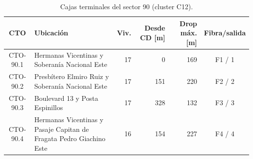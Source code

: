 \begin{table}[H]\centering\footnotesize
\caption{Cajas terminales del sector 90 (cluster C12).}\label{tab:sector90}
\begin{tabular}{|c|p{4.0cm}|r|r|r|c|}\hline \textbf{CTO} & \textbf{Ubicación} & \textbf{Viv.} & \textbf{Desde CD [m]} & \textbf{Drop máx. [m]} & \textbf{Fibra/salida} \\ \hline
CTO-90.1 & Hermanas Vicentinas y Soberanía Nacional Este & 17 & 0 & 169 & F1 / 1 \\ \hline
CTO-90.2 & Presbítero Elmiro Ruiz y Soberanía Nacional Este & 17 & 151 & 220 & F2 / 2 \\ \hline
CTO-90.3 & Boulevard 13 y Posta Espinillos & 17 & 328 & 132 & F3 / 3 \\ \hline
CTO-90.4 & Hermanas Vicentinas y Pasaje Capitan de Fragata Pedro Giachino Este & 16 & 154 & 227 & F4 / 4 \\ \hline
\end{tabular}\end{table}
